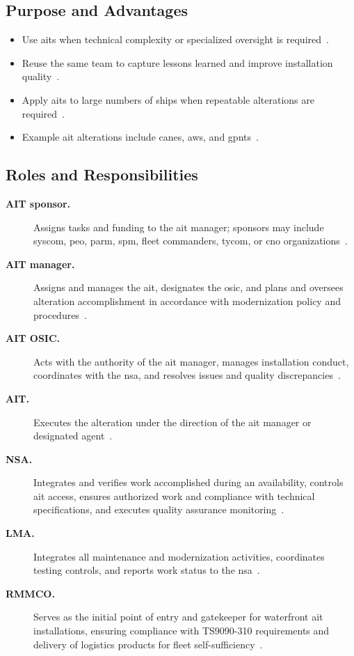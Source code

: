 \documentclass[../main.tex]{subfiles}
\begin{document}
\subsection{Purpose and Advantages}
\begin{itemize}
  \item Use \acp{ait} when technical complexity or specialized oversight is required~\autocite{edo-4-1-4-ait-fundamentals-2025}.
  \item Reuse the same team to capture lessons learned and improve installation quality~\autocite{edo-4-1-4-ait-fundamentals-2025}.
  \item Apply \acp{ait} to large numbers of ships when repeatable alterations are required~\autocite{edo-4-1-4-ait-fundamentals-2025}.
  \item Example \ac{ait} alterations include \ac{canes}, \ac{aws}, and \ac{gpnts}~\autocite{edo-4-1-4-ait-fundamentals-2025}.
\end{itemize}

\subsection{Roles and Responsibilities}
\begin{description}
  \item[\textbf{AIT sponsor.}] Assigns tasks and funding to the \ac{ait} manager; sponsors may include \ac{syscom}, \ac{peo}, \ac{parm}, \ac{spm}, fleet commanders, \ac{tycom}, or \ac{cno} organizations~\autocite{edo-4-1-4-ait-fundamentals-2025}.
  \item[\textbf{AIT manager.}] Assigns and manages the \ac{ait}, designates the \ac{osic}, and plans and oversees alteration accomplishment in accordance with modernization policy and procedures~\autocite{edo-4-1-4-ait-fundamentals-2025}.
  \item[\textbf{AIT OSIC.}] Acts with the authority of the \ac{ait} manager, manages installation conduct, coordinates with the \ac{nsa}, and resolves issues and quality discrepancies~\autocite{edo-4-1-4-ait-fundamentals-2025}.
  \item[\textbf{AIT.}] Executes the alteration under the direction of the \ac{ait} manager or designated agent~\autocite{edo-4-1-4-ait-fundamentals-2025}.
  \item[\textbf{NSA.}] Integrates and verifies work accomplished during an availability, controls \ac{ait} access, ensures authorized work and compliance with technical specifications, and executes quality assurance monitoring~\autocite{edo-4-1-4-ait-fundamentals-2025}.
  \item[\textbf{LMA.}] Integrates all maintenance and modernization activities, coordinates testing controls, and reports work status to the \ac{nsa}~\autocite{edo-4-1-4-ait-fundamentals-2025}.
  \item[\textbf{RMMCO.}] Serves as the initial point of entry and gatekeeper for waterfront \ac{ait} installations, ensuring compliance with TS9090-310 requirements and delivery of logistics products for fleet self-sufficiency~\autocite{edo-4-1-4-ait-fundamentals-2025,TS9090-310}.
\end{description}
\end{document}
